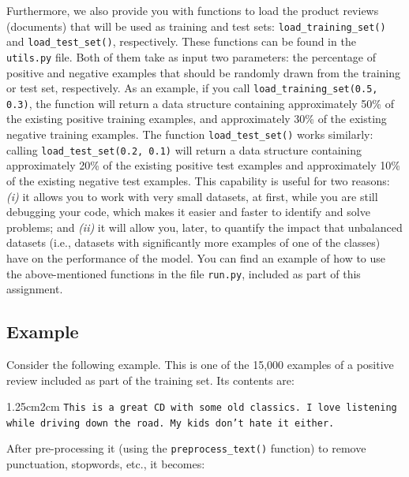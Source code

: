 \documentclass{article}
\begin{document}
\noindent Furthermore, we also provide you with functions to load the product reviews (documents) that will be used as training and test sets: \texttt{load\_training\_set()} and \texttt{load\_test\_set()}, respectively. These functions can be found in the \texttt{utils.py} file. Both of them take as input two parameters: the percentage of positive and negative examples that should be randomly drawn from the training or test set, respectively. As an example, if you call \texttt{load\_training\_set(0.5, 0.3)}, the function will return a data structure containing approximately 50\% of the existing positive training examples, and approximately 30\% of the existing negative training examples. The function \texttt{load\_test\_set()} works similarly: calling \texttt{load\_test\_set(0.2, 0.1)} will return a data structure containing approximately 20\% of the existing positive test examples and approximately 10\% of the existing negative test examples. This capability is useful for two reasons: \textit{(i)} it allows you to work with very small datasets, at first, while you are still debugging your code, which makes it easier and faster to identify and solve problems; and \textit{(ii)} it will allow you, later, to quantify the impact that unbalanced datasets (i.e., datasets with significantly more examples of one of the classes) have on the performance of the model. You can find an example of how to use the above-mentioned functions in the file \texttt{run.py}, included as part of this assignment.

\newpage
\subsection{Example}
\vspace{0.5cm}

Consider the following example. This is one of the 15,000 examples of a positive review included as part of the training set. Its contents are:
\vspace{0.5cm}

\begin{adjustwidth}{1.25cm}{2cm}
\texttt{This is a great CD with some old classics. I love listening while driving down the road. My kids don't hate it either.}
\end{adjustwidth}

\vspace{0.5cm}

\noindent After pre-processing it (using the \texttt{preprocess\_text()} function) to remove punctuation, stopwords, etc., it becomes:
\vspace{0.5cm}
\end{document}
